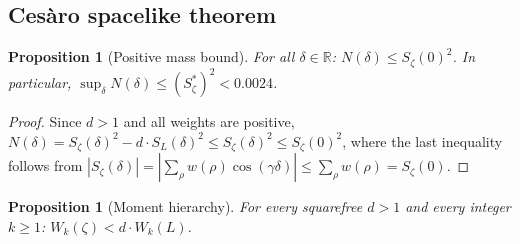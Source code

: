 \documentclass[12pt,reqno]{amsart}
\theoremstyle{plain}
\newtheorem{proposition}[theorem]{Proposition}
\theoremstyle{definition}
\theoremstyle{remark}
\newcommand{\R}{\mathbb{R}}
\begin{document}
\subsection{Ces\`aro spacelike theorem}

\begin{proposition}[Positive mass bound]\label{prop:positive-mass}
For all $\delta \in \R$: $N(\delta) \leq S_\zeta(0)^2$. In particular, $\sup_\delta N(\delta) \leq (S_\zeta^*)^2 < 0.0024$.
\end{proposition}

\begin{proof}
Since $d > 1$ and all weights are positive, $N(\delta) = S_\zeta(\delta)^2 - d \cdot S_{L}(\delta)^2 \leq S_\zeta(\delta)^2 \leq S_\zeta(0)^2$, where the last inequality follows from $|S_\zeta(\delta)| = |\sum_\rho w(\rho)\cos(\gamma\delta)| \leq \sum_\rho w(\rho) = S_\zeta(0)$.
\end{proof}

\begin{proposition}[Moment hierarchy]\label{prop:moment-hierarchy}
For every squarefree $d > 1$ and every integer $k \geq 1$: $W_k(\zeta) < d \cdot W_k(L)$.
\end{proposition}
\end{document}
